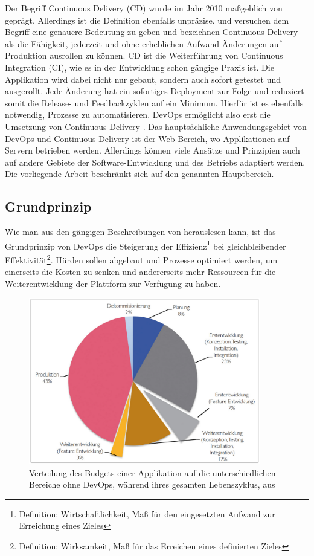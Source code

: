 Der Begriff Continuous Delivery (CD) wurde im Jahr 2010 maßgeblich von \cite{humble2010} geprägt. Allerdings ist die Definition ebenfalls unpräzise. \cite{fowler2013} und \cite{wolff2014} versuchen dem Begriff eine genauere Bedeutung zu geben und bezeichnen Continuous Delivery als die Fähigkeit, jederzeit und ohne erheblichen Aufwand Änderungen auf Produktion ausrollen zu können. CD ist die Weiterführung von Continuous Integration (CI), wie es in der Entwicklung schon gängige Praxis ist. Die Applikation wird dabei nicht nur gebaut, sondern auch sofort getestet und ausgerollt. Jede Änderung hat ein sofortiges Deployment zur Folge und reduziert somit die Release- und Feedbackzyklen auf ein Minimum. Hierfür ist es ebenfalls notwendig, Prozesse zu automatisieren. DevOps ermöglicht also erst die Umsetzung von Continuous Delivery \cite{schroeder2015}. Das hauptsächliche Anwendungsgebiet von DevOps und Continuous Delivery ist der Web-Bereich, wo Applikationen auf Servern betrieben werden. Allerdings können viele Ansätze und Prinzipien auch auf andere Gebiete der Software-Entwicklung und des Betriebs adaptiert werden. Die vorliegende Arbeit beschränkt sich auf den genannten Hauptbereich.

\subsection{Grundprinzip}
\label{sec:grundprinzipien}
Wie man aus den gängigen Beschreibungen von \cite{peschlow2012, brown2014, wolff2014} herauslesen kann, ist das Grundprinzip von DevOps die Steigerung der Effizienz\footnote{Definition: Wirtschaftlichkeit, Maß für den eingesetzten Aufwand zur Erreichung eines Zieles} bei gleichbleibender Effektivität\footnote{Definition: Wirksamkeit, Maß für das Erreichen eines definierten Zieles}. Hürden sollen abgebaut und Prozesse optimiert werden, um einerseits die Kosten zu senken und andererseits mehr Ressourcen für die Weiterentwicklung der Plattform zur Verfügung zu haben.

\begin{figure}[ht]
	\centering
	\includegraphics[width=0.9\textwidth]{img/budget_vorher.png}
	\caption[Budgetverteilung einer Applikation ohne DevOps, aus \cite{siprell2014}]{Verteilung des Budgets einer Applikation auf die unterschiedlichen Bereiche ohne DevOps, während ihres gesamten Lebenszyklus, aus \cite{siprell2014}}
	\label{fig:grundprinzip:budget_vorher}
\end{figure}  

